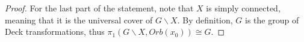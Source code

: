 \begin{proof}
    For the last part of the statement, note that \(X\) is simply connected, meaning that it is the universal cover of \(G \backslash X\). %
    By definition, \(G\) is the group of Deck transformations, thus \(\pi_1(G \backslash X, Orb(x_0)) \cong G\).
\end{proof}
